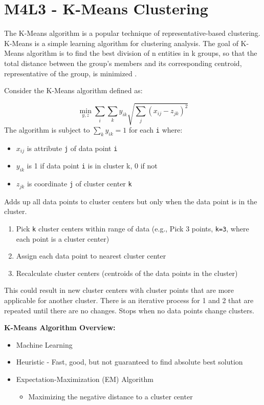 \documentclass[
]{book}
\providecommand{\tightlist}{%
  \setlength{\itemsep}{0pt}\setlength{\parskip}{0pt}}
\begin{document}
\section{M4L3 - K-Means Clustering}\label{m4l3---k-means-clustering}

The K-Means algorithm is a popular technique of representative-based clustering.
K-Means is a simple learning algorithm for clustering analysis.
The goal of K-Means algorithm is to find the best division of n entities in k groups, so that the total distance between the group's members and its corresponding centroid, representative of the group, is minimized .

Consider the K-Means algorithm defined as:

\[
\min_{y,z} \sum_i \sum_k y_{ik} \sqrt{\sum_j (x_{ij}-z_{jk})^2}
\]
The algorithm is subject to \(\sum_k y_{ik} = 1\) for each \texttt{i} where:

\begin{itemize}
\tightlist
\item
  \(x_{ij}\) is attribute \texttt{j} of data point \texttt{i}
\item
  \(y_{ik}\) is 1 if data point \texttt{i} is in cluster k, 0 if not
\item
  \(z_{jk}\) is coordinate \texttt{j} of cluster center \texttt{k}
\end{itemize}

Adds up all data points to cluster centers but only when the data point is in the cluster.

\begin{enumerate}
\def\labelenumi{\arabic{enumi}.}
\setcounter{enumi}{-1}
\tightlist
\item
  Pick \texttt{k} cluster centers within range of data (e.g., Pick 3 points, \texttt{k=3}, where each point is a cluster center)
\item
  Assign each data point to nearest cluster center
\item
  Recalculate cluster centers (centroids of the data points in the cluster)
\end{enumerate}

This could result in new cluster centers with cluster points that are more applicable for another cluster.
There is an iterative process for 1 and 2 that are repeated until there are no changes.
Stops when no data points change clusters.

\textbf{K-Means Algorithm Overview:}

\begin{itemize}
\tightlist
\item
  Machine Learning
\item
  Heuristic - Fast, good, but not guaranteed to find absolute best solution
\item
  Expectation-Maximization (EM) Algorithm

  \begin{itemize}
  \tightlist
  \item
    Maximizing the negative distance to a cluster center
  \end{itemize}
\end{itemize}
\end{document}
